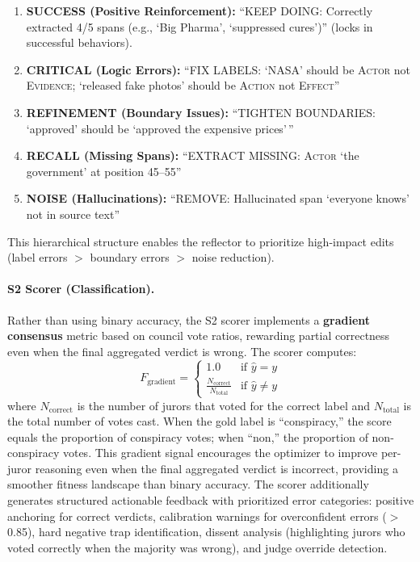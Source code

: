 \documentclass[11pt]{article}
\begin{document}
\begin{enumerate}[noitemsep]
	\item \textbf{SUCCESS (Positive Reinforcement):} ``KEEP DOING: Correctly extracted 4/5 spans (e.g., `Big Pharma', `suppressed cures')'' (locks in successful behaviors).
	\item \textbf{CRITICAL (Logic Errors):} ``FIX LABELS: `NASA' should be \textsc{Actor} not \textsc{Evidence}; `released fake photos' should be \textsc{Action} not \textsc{Effect}''
	\item \textbf{REFINEMENT (Boundary Issues):} ``TIGHTEN BOUNDARIES: `approved' should be `approved the expensive prices'\,''
	\item \textbf{RECALL (Missing Spans):} ``EXTRACT MISSING: \textsc{Actor} `the government' at position 45--55''
	\item \textbf{NOISE (Hallucinations):} ``REMOVE: Hallucinated span `everyone knows' not in source text''
\end{enumerate}

This hierarchical structure enables the reflector to prioritize high-impact
edits (label errors $>$ boundary errors $>$ noise reduction).

\paragraph{S2 Scorer (Classification).} Rather than using binary accuracy, the S2 scorer implements a \textbf{gradient
	consensus} metric based on council vote ratios, rewarding partial correctness
even when the final aggregated verdict is wrong. The scorer computes: $$
	F_{\text{gradient}} = \begin{cases}
		1.0                                         & \text{if } \hat{y} = y    \\
		\frac{N_{\text{correct}}}{N_{\text{total}}} & \text{if } \hat{y} \neq y
	\end{cases}
$$
where $N_{\text{correct}}$ is the number of jurors that voted for the correct
label and $N_{\text{total}}$ is the total number of votes cast. When the gold
label is ``conspiracy,'' the score equals the proportion of conspiracy votes;
when ``non,'' the proportion of non-conspiracy votes. This gradient signal
encourages the optimizer to improve per-juror reasoning even when the final
aggregated verdict is incorrect, providing a smoother fitness landscape than
binary accuracy. The scorer additionally generates structured actionable
feedback with prioritized error categories: positive anchoring for correct
verdicts, calibration warnings for overconfident errors ($>$0.85), hard
negative trap identification, dissent analysis (highlighting jurors who voted
correctly when the majority was wrong), and judge override detection.
\end{document}
